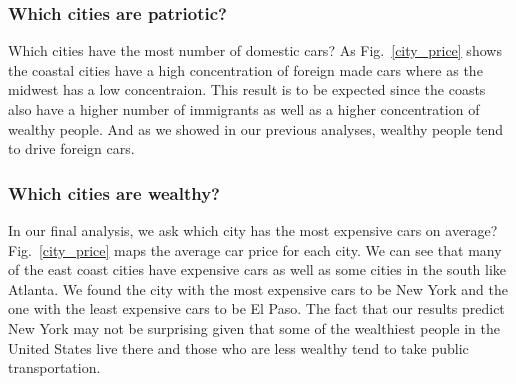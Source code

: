 \documentclass[10pt,twocolumn,letterpaper]{article}
\begin{document}
\subsubsection{Which cities are patriotic?}
Which cities have the most number of domestic cars? As Fig.~\ref{city_price} shows the coastal cities have a high concentration of foreign made cars where as the midwest has a low concentraion. This result is to be expected since the coasts also have a higher number of immigrants as well as a higher concentration of wealthy people. And as we showed in our previous analyses, wealthy people tend to drive foreign cars.

\subsubsection{Which cities are wealthy?}
In our final analysis, we ask which city has the most expensive cars on average? Fig.~\ref{city_price} maps the average car price for each city. We can see that many of the east coast cities have expensive cars as well as some cities in the south like Atlanta. We found the city with the most expensive cars to be New York and the one with the least expensive cars to be El Paso. The fact that our results predict New York may not be surprising given that some of the wealthiest people in the United States live there and those who are less wealthy tend to take public transportation.
\end{document}
